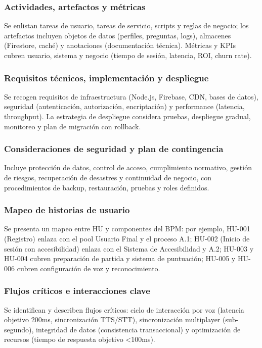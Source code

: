 \documentclass[12pt]{article}
\begin{document}
\subsubsection*{Actividades, artefactos y métricas}
Se enlistan tareas de usuario, tareas de servicio, scripts y reglas de negocio; los artefactos incluyen objetos de datos (perfiles, preguntas, logs), almacenes (Firestore, caché) y anotaciones (documentación técnica). Métricas y KPIs cubren usuario, sistema y negocio (tiempo de sesión, latencia, ROI, churn rate).

\subsubsection*{Requisitos técnicos, implementación y despliegue}
Se recogen requisitos de infraestructura (Node.js, Firebase, CDN, bases de datos), seguridad (autenticación, autorización, encriptación) y performance (latencia, throughput). La estrategia de despliegue considera pruebas, despliegue gradual, monitoreo y plan de migración con rollback.

\subsubsection*{Consideraciones de seguridad y plan de contingencia}
Incluye protección de datos, control de acceso, cumplimiento normativo, gestión de riesgos, recuperación de desastres y continuidad de negocio, con procedimientos de backup, restauración, pruebas y roles definidos.

\subsubsection*{Mapeo de historias de usuario}
Se presenta un mapeo entre HU y componentes del BPM: por ejemplo, HU-001 (Registro) enlaza con el pool Usuario Final y el proceso A.1; HU-002 (Inicio de sesión con accesibilidad) enlaza con el Sistema de Accesibilidad y A.2; HU-003 y HU-004 cubren preparación de partida y sistema de puntuación; HU-005 y HU-006 cubren configuración de voz y reconocimiento.

\subsubsection*{Flujos críticos e interacciones clave}
Se identifican y describen flujos críticos: ciclo de interacción por voz (latencia objetivo 200ms, sincronización TTS/STT), sincronización multiplayer (sub-segundo), integridad de datos (consistencia transaccional) y optimización de recursos (tiempo de respuesta objetivo <100ms).
\end{document}
